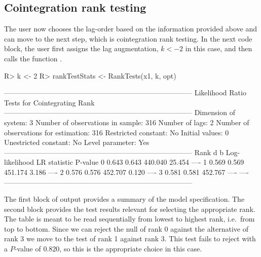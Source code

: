 \documentclass[article]{jss}
\newcommand{\fct}[1]{\code{#1()}}
\begin{document}
\subsection{Cointegration rank testing}

The user now chooses the lag-order based on the information provided above and can move to the next step, which is cointegration rank testing. 
In the next code block, the user first assigns the lag augmentation, $k<-2$ in this case, and then calls the function \fct{RankTests}. 


\begin{CodeChunk} 
\begin{CodeInput}
R> k <- 2
R> rankTestStats <- RankTests(x1, k, opt)
\end{CodeInput}
\begin{CodeOutput}
--------------------------------------------------------------------------------
             Likelihood Ratio Tests for Cointegrating Rank                               
--------------------------------------------------------------------------------
Dimension of system:       3     Number of observations in sample:          316 
Number of lags:            2     Number of observations for estimation:     316 
Restricted constant:      No     Initial values:                              0
Unestricted constant:     No     Level parameter:                           Yes
--------------------------------------------------------------------------------
Rank     d      b     Log-likelihood   LR statistic   P-value
 0     0.643  0.643          440.040         25.454      ----
 1     0.569  0.569          451.174          3.186      ----
 2     0.576  0.576          452.707          0.120      ----
 3     0.581  0.581          452.767           ----      ----
--------------------------------------------------------------------------------
\end{CodeOutput}
\end{CodeChunk} 

The first block of output provides a summary of the model specification. The second block provides the test results relevant for selecting the appropriate rank. The table is meant to be read sequentially from lowest to highest rank, i.e.\ from top to bottom. Since we can reject the null of rank 0 against the alternative of rank 3 we move to the test of rank 1 against rank 3. This test fails to reject with a $P$-value of $0.820$, so this is the appropriate choice in this case.
\end{document}
